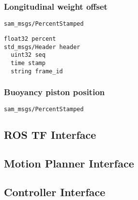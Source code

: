 \documentclass[9pt,technote]{IEEEtran} %
\begin{document}
\subsubsection{Longitudinal weight offset} \texttt{sam\_msgs/PercentStamped}
\begin{scriptsize}
\begin{verbatim}
float32 percent
std_msgs/Header header
  uint32 seq
  time stamp
  string frame_id
\end{verbatim}
\end{scriptsize}
\subsubsection{Buoyancy piston position} \texttt{sam\_msgs/PercentStamped}

\subsection{ROS TF Interface}

\subsection{Motion Planner Interface}

\subsection{Controller Interface}

%
%
\end{document}
